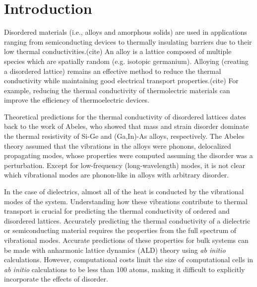 \documentclass[aps,prb,onecolumn,preprint,superscriptaddress,amsmath,amssymb,floatfix]{revtex4}
\begin{document}
\section{\label{S:Introduction}Introduction}

Disordered materials (i.e., alloys and amorphous solids) are used in 
applications ranging from semiconducting devices to thermally insulating  
barriers due to their low thermal conductivities.(cite) 
An alloy is a lattice composed of multiple species which are spatially 
random (e.g. isotopic germanium).\cite{tamura_isotope_1983} 
Alloying (creating a disordered lattice) remains an effective method 
to reduce the thermal conductivity 
while maintaining good electrical transport properties.(cite) 
For example, reducing 
the thermal conductivity of thermolectric materials can improve the 
efficiency of thermoelectric devices.
\cite{koh_lattice_2009,qiu_molecular_2012,tian_phonon_2012} 

Theoretical predictions for the thermal conductivity of disordered 
lattices dates back to 
the work of Abeles, who showed that mass and strain 
disorder dominate the thermal resistivity of Si-Ge and 
(Ga,In)-As alloys, respectively.\cite{abeles_lattice_1963} The Abeles 
theory assumed that the vibrations in the alloys were phonons, 
delocalized propagating modes, whose properties were computed 
assuming the disorder was a perturbation.
Except for low-frequency (long-wavelength) modes, it is not clear 
which vibrational modes are phonon-like in alloys with arbitrary 
disorder. 

In the case of dielectrics, almost all of the heat is conducted by
the vibrational modes of the system. 
Understanding how these vibrations contribute to thermal transport 
is crucial for predicting the 
thermal conductivity of ordered and disordered lattices. 
Accurately predicting the thermal conductivity of a dielectric or 
semiconducting material requires the properties from the full spectrum 
of vibrational modes.
\cite{ziman_electrons_2001,feldman_thermal_1993,allen_diffusons_1999} 
Accurate predictions of these properties for bulk systems 
can be made with anharmonic lattice dynamics (ALD) theory 
using \emph{ab initio} 
calculations.\cite{ward_intrinsic_2010,lindsay_thermal_2012,
garg_role_2011,
shiga_microscopic_2012,tian_phonon_2012,
shiomi_thermal_2011,esfarjani_heat_2011}
However, computational costs limit the size of computational cells 
in \emph{ab initio} calculations to be less than 100 atoms, 
making it difficult to explicitly incorporate the effects of disorder.
\cite{koker_thermal_2009,bao_first-principles_2012,
lindsay_thermal_2012,tian_phonon_2012,garg_role_2011}
\end{document}
